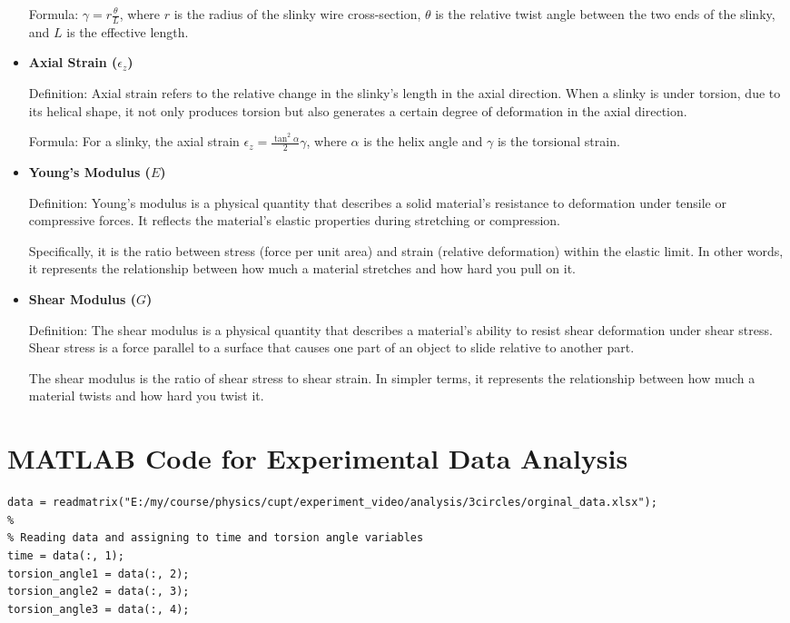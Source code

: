 \documentclass{mcmthesis}  %
\begin{document}
\begin{appendices}
\begin{itemize}
    Formula: $\gamma = r\frac{\theta}{L}$, where $r$ is the radius of the slinky wire cross-section, $\theta$ is the relative twist angle between the two ends of the slinky, and $L$ is the effective length.

    \item \textbf{Axial Strain ($\epsilon_z$)}
    
    Definition: Axial strain refers to the relative change in the slinky's length in the axial direction. When a slinky is under torsion, due to its helical shape, it not only produces torsion but also generates a certain degree of deformation in the axial direction.
    
    Formula: For a slinky, the axial strain $\epsilon_z = \frac{\tan^2 \alpha}{2}\gamma$, where $\alpha$ is the helix angle and $\gamma$ is the torsional strain.

    \item \textbf{Young's Modulus ($E$)}
    
    Definition: Young's modulus is a physical quantity that describes a solid material's resistance to deformation under tensile or compressive forces. It reflects the material's elastic properties during stretching or compression.
    
    Specifically, it is the ratio between stress (force per unit area) and strain (relative deformation) within the elastic limit. In other words, it represents the relationship between how much a material stretches and how hard you pull on it.

    \item \textbf{Shear Modulus ($G$)}
    
    Definition: The shear modulus is a physical quantity that describes a material's ability to resist shear deformation under shear stress. Shear stress is a force parallel to a surface that causes one part of an object to slide relative to another part.
    
    The shear modulus is the ratio of shear stress to shear strain. In simpler terms, it represents the relationship between how much a material twists and how hard you twist it.
\end{itemize}

\section{MATLAB Code for Experimental Data Analysis}  %

\begin{verbatim}
data = readmatrix("E:/my/course/physics/cupt/experiment_video/analysis/3circles/orginal_data.xlsx");
% 
% Reading data and assigning to time and torsion angle variables
time = data(:, 1);
torsion_angle1 = data(:, 2);
torsion_angle2 = data(:, 3);
torsion_angle3 = data(:, 4);


\end{verbatim}
\end{appendices}
\end{document}
